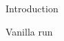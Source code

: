 \documentclass[10pt,a4paper]{article}
\begin{document}
\begin{section}{Introduction}
\begin{subsection}{Vanilla run}
%
%
%
%


\end{subsection}
\end{section}
\end{document}
